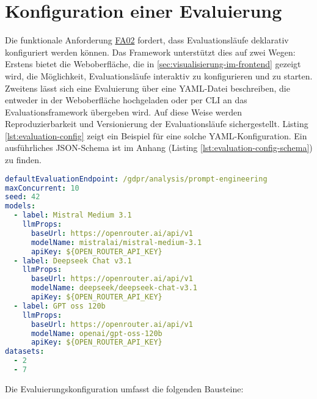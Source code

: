 \section{Konfiguration einer Evaluierung}\label{sec:konfiguration-einer-evaluierung}

Die funktionale Anforderung \hyperlink{FA02}{FA02} fordert, dass Evaluationsläufe deklarativ konfiguriert werden können. Das Framework unterstützt dies auf zwei Wegen:
Erstens bietet die Weboberfläche, die in \ref{sec:visualisierung-im-frontend} gezeigt wird, die Möglichkeit, Evaluationsläufe interaktiv zu konfigurieren und zu starten.
Zweitens lässt sich eine Evaluierung über eine YAML-Datei beschreiben, die entweder in der Weboberfläche hochgeladen oder per CLI an das Evaluationsframework übergeben wird. Auf diese Weise werden Reproduzierbarkeit und Versionierung der Evaluationsläufe sichergestellt. Listing \ref{lst:evaluation-config} zeigt ein Beispiel für eine solche YAML-Konfiguration. Ein ausführliches JSON-Schema ist im Anhang (Listing \ref{lst:evaluation-config-schema}) zu finden.

\begin{lstlisting}[language=yaml,caption={Beispiel einer Evaluierungskonfiguration in YAML.},label={lst:evaluation-config}]
defaultEvaluationEndpoint: /gdpr/analysis/prompt-engineering
maxConcurrent: 10
seed: 42
models:
  - label: Mistral Medium 3.1
    llmProps:
      baseUrl: https://openrouter.ai/api/v1
      modelName: mistralai/mistral-medium-3.1
      apiKey: ${OPEN_ROUTER_API_KEY}
  - label: Deepseek Chat v3.1
    llmProps:
      baseUrl: https://openrouter.ai/api/v1
      modelName: deepseek/deepseek-chat-v3.1
      apiKey: ${OPEN_ROUTER_API_KEY}
  - label: GPT oss 120b
    llmProps:
      baseUrl: https://openrouter.ai/api/v1
      modelName: openai/gpt-oss-120b
      apiKey: ${OPEN_ROUTER_API_KEY}
datasets:
  - 2
  - 7
\end{lstlisting}

Die Evaluierungskonfiguration umfasst die folgenden Bausteine:

